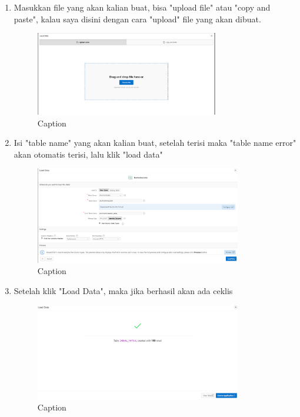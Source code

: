 \documentclass{article}
\begin{document}
\begin{enumerate}
    \item Masukkan file yang akan kalian buat, bisa "upload file" atau "copy and paste", kalau saya disini dengan cara "upload" file yang akan dibuat.
     \begin{figure}[!htbp]
        \centering
        \includegraphics [width=8cm]{figure/Capture14.PNG}
        \caption{Caption}
        \label{capture3}
    \end{figure}
    
    \item Isi "table name" yang akan kalian buat, setelah terisi maka "table name error" akan otomatis terisi, lalu klik "load data"
     \begin{figure}[!htbp]
        \centering
        \includegraphics [width=9cm]{figure/Capture15.PNG}
        \caption{Caption}
        \label{fig:my_label}
    \end{figure}
    
    \item Setelah klik "Load Data", maka jika berhasil akan ada ceklis 
     \begin{figure}[!htbp]
        \centering
        \includegraphics [width=9cm]{figure/Capture5.PNG}
        \caption{Caption}
        \label{fig:my_label}
    \end{figure}
    

\end{enumerate}
\end{document}
